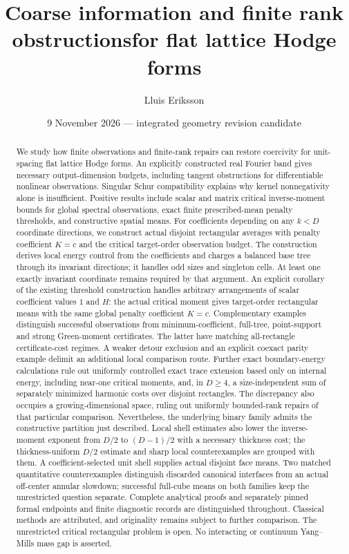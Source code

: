\documentclass[11pt]{article}
\title{Coarse information and finite rank obstructions\newline for flat lattice Hodge forms}
\author{Lluis Eriksson}
\date{9 November 2026 --- integrated geometry revision candidate}
\begin{document}
\maketitle
\begin{abstract}
We study how finite observations and finite-rank repairs can restore coercivity
for unit-spacing flat lattice Hodge forms. An explicitly constructed real Fourier
band gives necessary output-dimension budgets, including tangent obstructions
for differentiable nonlinear observations. Singular Schur compatibility explains
why kernel nonnegativity alone is insufficient. Positive results include scalar
and matrix critical inverse-moment bounds for global spectral observations,
exact finite prescribed-mean penalty thresholds, and constructive spatial means.
For coefficients depending on any $k<D$ coordinate directions, we construct
actual disjoint rectangular averages with penalty coefficient $K=c$ and the
critical target-order observation budget. The construction derives local energy
control from the coefficients and charges a balanced base tree through its
invariant directions; it handles odd sizes and singleton cells. At least one
exactly invariant coordinate remains required by that argument. An explicit corollary of the existing threshold construction handles
arbitrary arrangements of scalar coefficient values $1$ and $H$:
the actual critical moment gives target-order rectangular means with the
same global penalty coefficient $K=c$. Complementary
examples distinguish successful observations from minimum-coefficient, full-tree,
point-support and strong Green-moment certificates. The latter have matching
all-rectangle certificate-cost regimes. A weaker detour exclusion and an explicit
coexact parity example delimit an additional local comparison route.
Further exact boundary-energy calculations rule out uniformly controlled
exact trace extension based only on internal energy, including near-one
critical moments, and, in $D\ge4$, a size-independent
sum of separately minimized harmonic costs over disjoint rectangles.
The discrepancy also occupies a growing-dimensional space, ruling out
uniformly bounded-rank repairs of that particular comparison. Nevertheless,
the underlying binary family admits the constructive partition just described.
Local shell estimates also lower the inverse-moment exponent from $D/2$
to $(D-1)/2$ with a necessary thickness cost; the thickness-uniform
$D/2$ estimate and sharp local counterexamples are grouped with them.
A coefficient-selected unit shell supplies actual disjoint face means.
Two matched quantitative counterexamples distinguish discarded canonical
interfaces from an actual off-center annular slowdown; successful full-cube
means on both families keep the unrestricted question separate.
Complete analytical proofs and separately
pinned formal endpoints and finite diagnostic records are distinguished
throughout. Classical methods are attributed, and originality remains subject
to further comparison. The unrestricted critical rectangular problem is open.
No interacting or continuum Yang--Mills mass gap is asserted.
\end{abstract}
\clearpage
\end{document}
